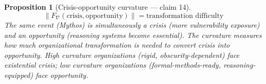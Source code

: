\documentclass[11pt,a4paper]{article}
\newtheorem{proposition}[definition]{Proposition}
\begin{document}
\begin{proposition}[Crisis-opportunity curvature --- claim 14]
\label{prop:crisis}
\[
  \|F_\nabla(\text{crisis}, \text{opportunity})\| =
    \text{transformation difficulty}
\]
The same event (Mythos) is simultaneously a crisis (more vulnerability
exposure) and an opportunity (reasoning systems become essential). The
curvature measures how much organizational transformation is needed to
convert crisis into opportunity. High curvature organizations (rigid,
obscurity-dependent) face existential crisis; low curvature organizations
(formal-methods-ready, reasoning-equipped) face opportunity.
\end{proposition}
\end{document}
